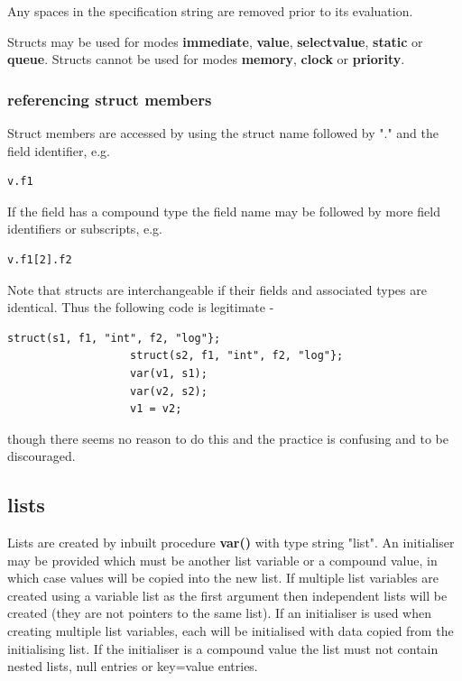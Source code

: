                 Any spaces in the specification string are removed prior
                to its evaluation.

                Structs may be used for modes {\bf immediate}, {\bf value},
                {\bf selectvalue}, {\bf static} or {\bf queue}. Structs cannot
                be used for modes {\bf memory}, {\bf clock} or {\bf priority}.

            \subsubsection{referencing struct members}
                
                Struct members are accessed by using the struct name followed
                by "." and the field identifier, e.g.
                \begin{lstlisting}[gobble=16, language=threepl]
                   v.f1
                \end{lstlisting}
                If the field has a compound type the field name may be
                followed by more field identifiers or subscripts, e.g.
                \begin{lstlisting}[gobble=16, language=threepl]
                   v.f1[2].f2
                \end{lstlisting}
                
                Note that structs are interchangeable if their fields and
                associated types are identical. Thus the following code
                is legitimate -
                \begin{lstlisting}[gobble=16, language=threepl]
                   struct(s1, f1, "int", f2, "log"};
                   struct(s2, f1, "int", f2, "log"};
                   var(v1, s1);
                   var(v2, s2);
                   v1 = v2;
                \end{lstlisting}
                though there seems no reason to do this and the practice
                is confusing and to be discouraged.


        \subsection{lists}\label{sec:sseclists}
        
            Lists are created by inbuilt procedure {\bf var()} with type string
            "list". An initialiser may be provided which must be another list
            variable or a compound value, in which case values will be copied
            into the new list. If multiple list variables are created using a
            variable list as the first argument then independent lists will be
            created (they are not pointers to the same list). If an initialiser
            is used when creating multiple list variables, each will be
            initialised with data copied from the initialising list. If the
            initialiser is a compound value the list must not contain nested
            lists, null entries or key=value entries.
            
